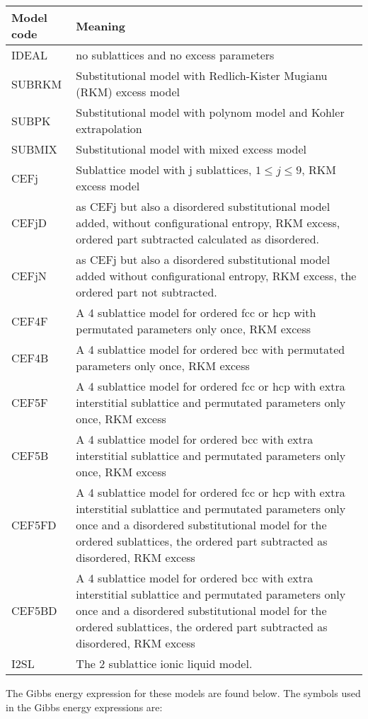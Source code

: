 \documentclass[12pt]{article}
\begin{document}
\begin{tabular}{l p{130mm}}
Model code & Meaning\\\hline
IDEAL & no sublattices and no excess parameters\\
SUBRKM & Substitutional model with Redlich-Kister Mugianu (RKM) excess model\\
SUBPK  & Substitutional model with polynom model and Kohler extrapolation\\
SUBMIX & Substitutional model with mixed excess model\\
CEFj   & Sublattice model with j sublattices, $1\leq j\leq 9$, RKM excess model\\
CEFjD & as CEFj but also a disordered substitutional model added, without configurational entropy, RKM excess, ordered part subtracted calculated as disordered.\\
CEFjN & as CEFj but also a disordered substitutional model added without configurational entropy, RKM excess, the ordered part not subtracted.\\
CEF4F & A 4 sublattice model for ordered fcc or hcp with permutated parameters only once, RKM excess\\
CEF4B & A 4 sublattice model for ordered bcc with permutated parameters only once, RKM excess\\
CEF5F & A 4 sublattice model for ordered fcc or hcp with extra interstitial sublattice
and permutated parameters only once, RKM excess\\
CEF5B & A 4 sublattice model for ordered bcc with extra interstitial sublattice
and permutated parameters only once, RKM excess\\
CEF5FD & A 4 sublattice model for ordered fcc or hcp with extra interstitial sublattice and permutated parameters only once and a disordered substitutional model for the ordered sublattices, the ordered part subtracted as disordered, 
RKM excess\\
CEF5BD & A 4 sublattice model for ordered bcc with extra interstitial sublattice
and permutated parameters only once and a disordered substitutional model for
the ordered sublattices, the ordered part subtracted as disordered, RKM excess\\
I2SL & The 2 sublattice ionic liquid model.\\\hline
\end{tabular}

\bigskip

The Gibbs energy expression for these models are found below.  The
symbols used in the Gibbs energy expressions are:
\end{document}
